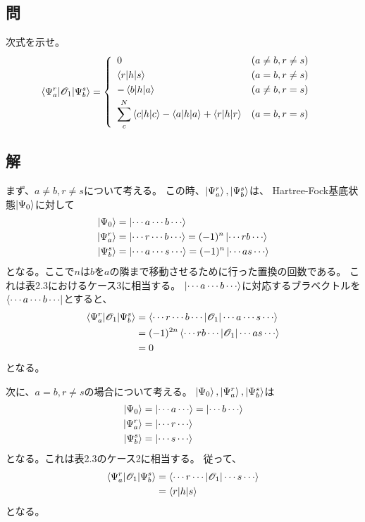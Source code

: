 \subsection{問}
次式を示せ。
\begin{align}
	\braket{\Psi_{a}^{r}|\Oone|\Psi_{b}^{s}}
&=
	\left\{
	\begin{array}{>{\displaystyle}ll}
		0 					& (a\neq b, r\neq s) \\[1mm]
		\braket{r|h|s}		& (a=b, r\neq s) \\[1mm]
		-\braket{b|h|a}		& (a\neq b, r=s) \\[1mm]
		\sum_c^N \braket{c|h|c}
		-
		\braket{a|h|a}
		+
		\braket{r|h|r}		& (a=b, r=s)
	\end{array}
	\right.
\end{align}


\subsection{解}
まず、$a\neq b,r\neq s$について考える。
この時、$\ket{\Psi_{a}^{r}}, \ket{\Psi_{b}^{s}}$は、
Hartree-Fock基底状態$\ket{\Psi_0}$に対して
\begin{align}
	\ket{\Psi_0}
&=
	\ket{\cdots a\cdots b\cdots} \\
%
%
	\ket{\Psi_{a}^{r}}
&=
	\ket{\cdots r\cdots b\cdots}
=
	(-1)^n \ket{\cdots rb\cdots} \\
%
%
	\ket{\Psi_{b}^{s}}
&=
	\ket{\cdots a\cdots s\cdots}
=
	(-1)^n \ket{\cdots as\cdots}
\end{align}
となる。ここで$n$は$b$を$a$の隣まで移動させるために行った置換の回数である。
これは表2.3におけるケース3に相当する。
$\ket{\cdots a\cdots b\cdots}$に対応するブラベクトルを
$\bra{\cdots a\cdots b\cdots}$とすると、
\begin{align}
	\braket{\Psi_{a}^{r}|\Oone|\Psi_{b}^{s}}
&=
	\braket{\cdots r\cdots b\cdots|\Oone|\cdots a\cdots s\cdots} \\
%
%
&=
	(-1)^{2n}
	\braket{\cdots rb\cdots|\Oone|\cdots as\cdots} \\
%
%
&=
	0
\end{align}
となる。

次に、$a=b, r\neq s$の場合について考える。
$\ket{\Psi_0},\ket{\Psi_{a}^{r}},\ket{\Psi_{b}^{s}}$は
\begin{align}
	\ket{\Psi_0}
&=
	\ket{\cdots a\cdots}
=
	\ket{\cdots b\cdots} \\
%
%
	\ket{\Psi_{a}^{r}}
&=
	\ket{\cdots r\cdots} \\
%
%
	\ket{\Psi_{b}^{s}}
&=
	\ket{\cdots s\cdots}
\end{align}
となる。これは表2.3のケース2に相当する。
従って、
\begin{align}
	\braket{\Psi_{a}^{r}|\Oone|\Psi_{b}^{s}}
&=
	\braket{\cdots r\cdots|\Oone|\cdots s\cdots} \\
%
%
&=
	\braket{r|h|s}
\end{align}
となる。


